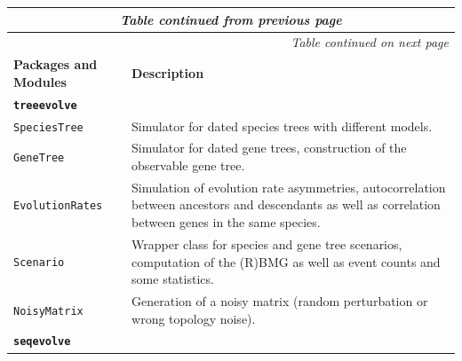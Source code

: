 \documentclass[hidelinks,11pt]{article}
\begin{document}
{\footnotesize
\setlength{\tabcolsep}{6pt}
\renewcommand{\arraystretch}{1.4}
\begin{longtable}{| p{4.0cm} | p{10cm} |}
	\endfirsthead
	\multicolumn{2}{c}{\textit{Table continued from previous page}}\\
	\hline
	\endhead
	\hline \multicolumn{2}{r}{\textit{Table continued on next page}} \\
	\endfoot
	\hline
	\endlastfoot
	\hline
	\textbf{Packages and Modules} & \textbf{Description} \\
	\hline
	\multicolumn{2}{|l|}{\textbf{\texttt{treeevolve}}}\\
	\hline
	\texttt{SpeciesTree} &
	Simulator for dated species trees with different models. \\
	\texttt{GeneTree} &
	Simulator for dated gene trees, construction of the observable gene tree. \\
	\texttt{EvolutionRates} &
	Simulation of evolution rate asymmetries, autocorrelation between ancestors and descendants as well as correlation between genes in the same species. \\
	\texttt{Scenario} &
	Wrapper class for species and gene tree scenarios, computation of the (R)BMG as well as event counts and some statistics. \\
	\texttt{NoisyMatrix} &
	Generation of a noisy matrix (random perturbation or wrong topology noise). \\
	\hline
	\multicolumn{2}{|l|}{\textbf{\texttt{seqevolve}}}\\
	\hline

\end{longtable}}
\end{document}
